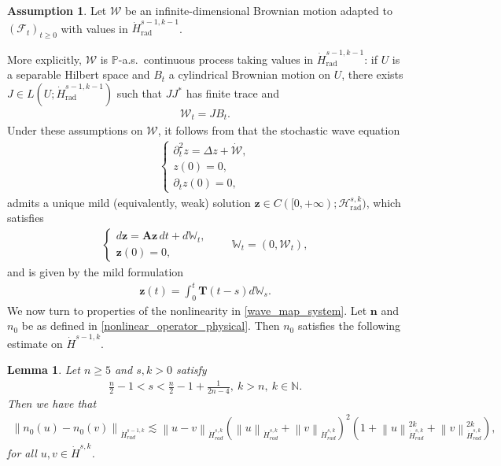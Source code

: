 \documentclass[12pt,reqno]{amsart}
\theoremstyle{plain}
\theoremstyle{remark}
\theoremstyle{plain}
\newtheorem{lemma}[theorem]{Lemma}
\theoremstyle{definition}
\newtheorem{assumption}[theorem]{Assumption}
\numberwithin{equation}{section}
\numberwithin{equation}{section}
\def\N{{\mathbb N}}
\newcommand{\norm}[1]{\left\|#1\right\|}
\newcommand{\HH}{\mathcal{H}}
\begin{document}
	\begin{assumption}\label{HP_noise_1}
		Let $\mathcal{W}$ be an infinite-dimensional Brownian motion adapted to $(\mathcal{F}_t)_{t \ge 0}$ with values in $\dot{H}^{s-1,k-1}_{\mathrm{rad}}$.  
	\end{assumption}
	More explicitly, $\mathcal{W}$ is $\mathbb{P}$-a.s.~continuous process taking values in $\dot{H}^{s-1,k-1}_{\mathrm{rad}}$: if $U$ is a separable Hilbert space and $B_t$ a cylindrical Brownian motion on $U$, there exists $J \in L(U;\dot{H}^{s-1,k-1}_{\mathrm{rad}})$ such that $JJ^*$ has finite trace and 
\begin{align}\label{formulation_2_noise}
  \mathcal{W}_t = J B_t.
\end{align}
Under these assumptions on $\mathcal{W}$, it follows from \cite{da2014stochastic} that the stochastic wave equation
\begin{align}\label{Eq:Stoch_lin_wave}
\begin{cases}
\partial_t^2 z = \Delta z + \dot{\mathcal{W}},\\
z(0) = 0,\\
\partial_t z(0) = 0,
\end{cases}
\end{align}
admits a unique mild (equivalently, weak) solution $\mathbf{z} \in C([0,+\infty); \HH_{\mathrm{rad}}^{s,k})$, which satisfies
\begin{align}\label{stochastic_wave}
\begin{cases}
d\mathbf{z} = \mathbf{A}\mathbf{z}\,dt + d\mathbb{W}_t,\\
\mathbf{z}(0) = 0,
\end{cases}
\qquad \mathbb{W}_t = (0, \mathcal{W}_t),
\end{align}
and is given by the mild formulation
	\begin{align*}
	    \mathbf{z}(t)=\int_0^t \mathbf{T}(t-s)d\mathbb{W}_s.
	\end{align*}
	We now turn to properties of the nonlinearity in \eqref{wave_map_system}.  
Let $\mathbf{n}$ and $n_0$ be as defined in \eqref{nonlinear_operator_physical}.  
Then $n_0$ satisfies the following estimate on $\dot{H}^{s-1,k}$.
	\begin{lemma}\label{lemma_regularity_nonlinear}
		Let $n\geq 5$ and $s,k>0$ satisfy \begin{align*}
			\frac{n}{2}-1<s<\frac{n}{2}-1+\frac{1}{2n-4},\ k>n,\ k\in \N.\end{align*}   
		Then we have that
		\begin{align*}
			\norm{n_0(u)-n_0(v)}_{\dot{H}^{s-1,k}_{rad}} \lesssim \norm{u-v}_{\dot{H}^{s,k}_{rad}}\left(\norm{u}_{\dot{H}^{s,k}_{rad}}+\norm{v}_{\dot{H}^{s,k}_{rad}}\right)^2\left(1+\norm{u}_{\dot{H}^{s,k}_{rad}}^{2k}+\norm{v}_{\dot{H}^{s,k}_{rad}}^{2k}\right),
		\end{align*}
    for all $u,v\in \dot{H}^{s,k}$.
	\end{lemma}
\end{document}
